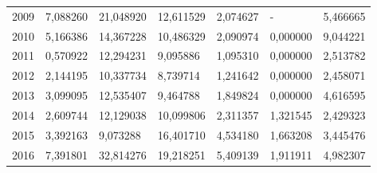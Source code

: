 \begin{table}
\begin{tabular}{p{1cm}p{2cm}p{2cm}p{2cm}p{2cm}p{2cm}p{2cm}}
 2009 &         7,088260 &                 21,048920 &                                   12,611529 &                            2,074627 &                        - &                         5,466665 \\
 2010 &         5,166386 &                 14,367228 &                                   10,486329 &                            2,090974 &                 0,000000 &                         9,044221 \\
 2011 &         0,570922 &                 12,294231 &                                    9,095886 &                            1,095310 &                 0,000000 &                         2,513782 \\
 2012 &         2,144195 &                 10,337734 &                                    8,739714 &                            1,241642 &                 0,000000 &                         2,458071 \\
 2013 &         3,099095 &                 12,535407 &                                    9,464788 &                            1,849824 &                 0,000000 &                         4,616595 \\
 2014 &         2,609744 &                 12,129038 &                                   10,099806 &                            2,311357 &                 1,321545 &                         2,429323 \\
 2015 &         3,392163 &                  9,073288 &                                   16,401710 &                            4,534180 &                 1,663208 &                         3,445476 \\
 2016 &         7,391801 &                 32,814276 &                                   19,218251 &                            5,409139 &                 1,911911 &                         4,982307 \\
\bottomrule
\end{tabular}
\end{table}
